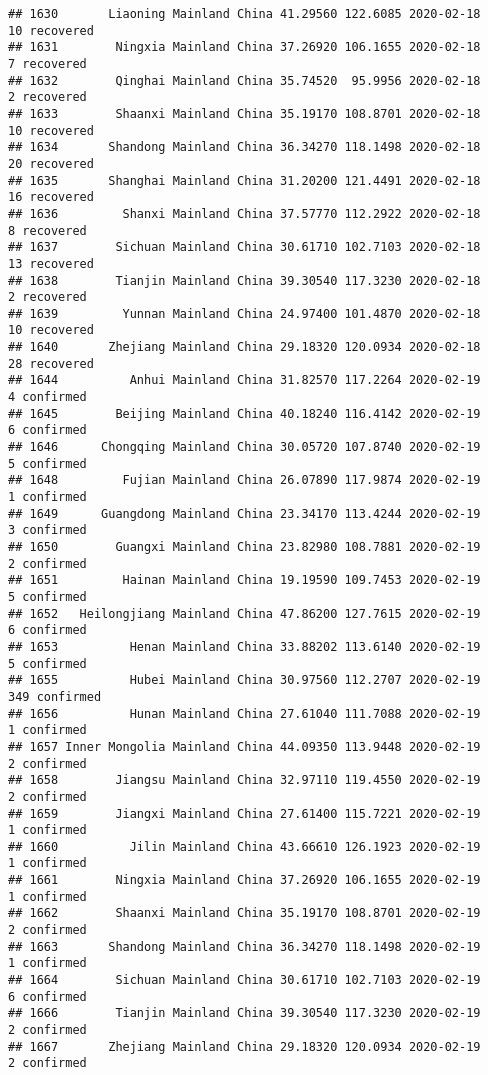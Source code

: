 \documentclass[
]{article}
\begin{document}
\begin{verbatim}
## 1630       Liaoning Mainland China 41.29560 122.6085 2020-02-18    10 recovered
## 1631        Ningxia Mainland China 37.26920 106.1655 2020-02-18     7 recovered
## 1632        Qinghai Mainland China 35.74520  95.9956 2020-02-18     2 recovered
## 1633        Shaanxi Mainland China 35.19170 108.8701 2020-02-18    10 recovered
## 1634       Shandong Mainland China 36.34270 118.1498 2020-02-18    20 recovered
## 1635       Shanghai Mainland China 31.20200 121.4491 2020-02-18    16 recovered
## 1636         Shanxi Mainland China 37.57770 112.2922 2020-02-18     8 recovered
## 1637        Sichuan Mainland China 30.61710 102.7103 2020-02-18    13 recovered
## 1638        Tianjin Mainland China 39.30540 117.3230 2020-02-18     2 recovered
## 1639         Yunnan Mainland China 24.97400 101.4870 2020-02-18    10 recovered
## 1640       Zhejiang Mainland China 29.18320 120.0934 2020-02-18    28 recovered
## 1644          Anhui Mainland China 31.82570 117.2264 2020-02-19     4 confirmed
## 1645        Beijing Mainland China 40.18240 116.4142 2020-02-19     6 confirmed
## 1646      Chongqing Mainland China 30.05720 107.8740 2020-02-19     5 confirmed
## 1648         Fujian Mainland China 26.07890 117.9874 2020-02-19     1 confirmed
## 1649      Guangdong Mainland China 23.34170 113.4244 2020-02-19     3 confirmed
## 1650        Guangxi Mainland China 23.82980 108.7881 2020-02-19     2 confirmed
## 1651         Hainan Mainland China 19.19590 109.7453 2020-02-19     5 confirmed
## 1652   Heilongjiang Mainland China 47.86200 127.7615 2020-02-19     6 confirmed
## 1653          Henan Mainland China 33.88202 113.6140 2020-02-19     5 confirmed
## 1655          Hubei Mainland China 30.97560 112.2707 2020-02-19   349 confirmed
## 1656          Hunan Mainland China 27.61040 111.7088 2020-02-19     1 confirmed
## 1657 Inner Mongolia Mainland China 44.09350 113.9448 2020-02-19     2 confirmed
## 1658        Jiangsu Mainland China 32.97110 119.4550 2020-02-19     2 confirmed
## 1659        Jiangxi Mainland China 27.61400 115.7221 2020-02-19     1 confirmed
## 1660          Jilin Mainland China 43.66610 126.1923 2020-02-19     1 confirmed
## 1661        Ningxia Mainland China 37.26920 106.1655 2020-02-19     1 confirmed
## 1662        Shaanxi Mainland China 35.19170 108.8701 2020-02-19     2 confirmed
## 1663       Shandong Mainland China 36.34270 118.1498 2020-02-19     1 confirmed
## 1664        Sichuan Mainland China 30.61710 102.7103 2020-02-19     6 confirmed
## 1666        Tianjin Mainland China 39.30540 117.3230 2020-02-19     2 confirmed
## 1667       Zhejiang Mainland China 29.18320 120.0934 2020-02-19     2 confirmed

\end{verbatim}
\end{document}
